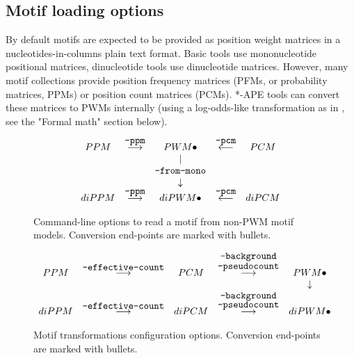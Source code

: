 \subsection{Motif loading options}
By default motifs are expected to be provided as position weight matrices in a nucleotides-in-columns plain text format. Basic tools use mononucleotide positional matrices, dinucleotide tools use dinucleotide matrices. However, many motif collections provide position frequency matrices (PFMs, or probability matrices, PPMs) or position count matrices (PCMs). *-APE tools can convert these matrices to PWMs internally (using a log-odds-like transformation as in \cite{Lifanov2003}, see the "Formal math" section below).


\begin{figure}[h]
\centering
$$\begin{array}{ccccc}
PPM     &  \stackrel{\mbox{\texttt{--ppm}}}{\longrightarrow}  & PWM \bullet               & \stackrel{\mbox{\texttt{--pcm}}}{\longleftarrow}  &  PCM  \\
        &                                                 &          |                &                                               &  \\
        &                                                 & \mbox{\texttt{--from-mono}}   &                                               &  \\
        &                                                 &     \downarrow            &                                               &  \\
diPPM   &  \stackrel{\mbox{\texttt{--ppm}}}{\longrightarrow}  & diPWM \bullet             & \stackrel{\mbox{\texttt{--pcm}}}{\longleftarrow}  &  diPCM
\end{array}$$
\caption{Command-line options to read a motif from non-PWM motif models. Conversion end-points are marked with bullets.}\label{motif-conversion-types}
\end{figure}


\begin{figure}[h]
\centering
$$\begin{array}{ccccc}
PPM   & \stackrel{\mbox{\texttt{--effective-count}}}{\longrightarrow} & PCM   & \stackrel{\mbox{\texttt{--background}}}{\stackrel{\mbox{\texttt{--pseudocount}}}{\longrightarrow}} & PWM \bullet \\
      &                                                           &       &                                                                                            & \downarrow \\
diPPM & \stackrel{\mbox{\texttt{--effective-count}}}{\longrightarrow} & diPCM & \stackrel{\stackrel{\mbox{\texttt{--background}}}{\mbox{\texttt{--pseudocount}}}}{\longrightarrow} & diPWM \bullet
\end{array}$$
\caption{Motif transformations configuration options. Conversion end-points are marked with bullets.}\label{motif-conversion-configuration}
\end{figure}


